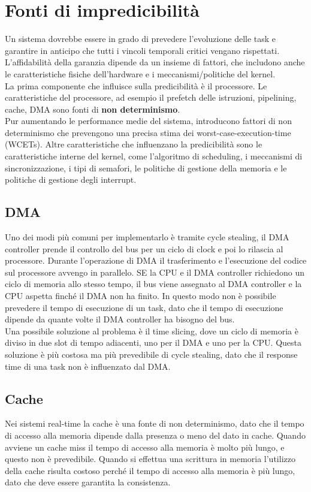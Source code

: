\documentclass[12pt,openany,onesided]{book}
\begin{document}
\chapter{Fonti di impredicibilità}
Un sistema dovrebbe essere in grado di prevedere l'evoluzione delle task e garantire in anticipo che tutti i vincoli temporali critici 
vengano rispettati.
L'affidabilità della garanzia dipende da un insieme di fattori, che includono anche le caratteristiche fisiche dell'hardware e 
i meccanismi/politiche del kernel.
\\
La prima componente che influisce sulla predicibilità è il processore. Le caratteristiche del processore, ad esempio il prefetch delle istruzioni, 
pipelining, cache, DMA sono fonti di \textbf{non determinismo}.
\\
Pur aumentando le performance medie del sistema, introducono fattori di non determinismo che prevengono una precisa stima dei worst-case-execution-time (WCETs).
Altre caratteristiche che influenzano la predicibilità sono le caratteristiche interne del kernel, come l'algoritmo di scheduling, i meccanismi di sincronizzazione, 
i tipi di semafori, le politiche di gestione della memoria e le politiche di gestione degli interrupt.
\section{DMA}
Uno dei modi più comuni per implementarlo è tramite cycle stealing, il DMA controller prende il controllo del bus per un ciclo di clock 
e poi lo rilascia al processore.
Durante l'operazione di DMA il trasferimento e l'esecuzione del codice sul processore avvengo in parallelo.
SE la CPU e il DMA controller richiedono un ciclo di memoria allo stesso tempo, il bus viene assegnato al DMA controller e la CPU
aspetta finché il DMA non ha finito.
In questo modo non è possibile prevedere il tempo di esecuzione di un task, dato che il tempo di esecuzione dipende da quante volte il DMA controller ha bisogno del bus.
\\
Una possibile soluzione al problema è il time slicing, dove un ciclo di memoria è diviso in due slot di tempo adiacenti, uno per il DMA e uno per la CPU.
Questa soluzione è più costosa ma più prevedibile di cycle stealing, dato che il response time di una task non è influenzato dal DMA.
\section{Cache}
Nei sistemi real-time la cache è una fonte di non determinismo, dato che il tempo di accesso alla memoria dipende dalla presenza o meno del dato in cache.
Quando avviene un cache miss il tempo di accesso alla memoria è molto più lungo, e questo non è prevedibile.
Quando si effettua una scrittura in memoria l'utilizzo della cache risulta costoso perché il tempo di accesso alla memoria è più lungo, dato che deve essere garantita la consistenza.
\end{document}
